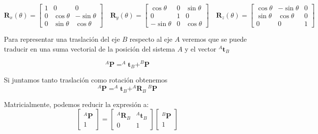 \begin{equation}
    \boldsymbol{R}_x(\theta) =
    \begin{bmatrix}
        1 & 0            & 0             \\
        0 & \cos{\theta} & -\sin{\theta} \\
        0 & \sin{\theta} & \cos{\theta}
    \end{bmatrix}
    \quad
    \boldsymbol{R}_y(\theta) =
    \begin{bmatrix}
        \cos{\theta}  & 0 & \sin{\theta} \\
        0             & 1 & 0            \\
        -\sin{\theta} & 0 & \cos{\theta}
    \end{bmatrix}
    \quad
    \boldsymbol{R}_z(\theta) =
    \begin{bmatrix}
        \cos{\theta} & -\sin{\theta} & 0 \\
        \sin{\theta} & \cos{\theta}  & 0 \\
        0            & 0             & 1
    \end{bmatrix}
\end{equation}

Para representar una traslación del eje $B$ respecto al eje $A$ veremos que se
puede traducir en una suma vectorial de la posición del sistema $A$ y el vector
$^{A}\boldsymbol{t}_B$

\begin{equation*}
    ^{A}\boldsymbol{P}  = ^{A}\boldsymbol{t}_B +  ^{B}\boldsymbol{P}
\end{equation*}

Si juntamos tanto traslación como rotación obtenemos
\begin{equation*}
    ^{A}\boldsymbol{P}  = ^{A}\boldsymbol{t}_B +  ^{A}\boldsymbol{R}_B \ ^{B}\boldsymbol{P}
\end{equation*}

Matricialmente, podemos reducir la expresión a:
\begin{equation}
    \begin{bmatrix}
        ^{A}\boldsymbol{P} \\1
    \end{bmatrix} = \begin{bmatrix}
        ^{A}\boldsymbol{R}_B & ^{A}\boldsymbol{t}_B \\
        0       & 1
    \end{bmatrix} \begin{bmatrix}
        ^{B}\boldsymbol{P} \\ 1
    \end{bmatrix}
\end{equation}

